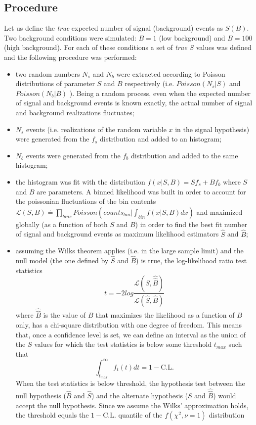 \documentclass[10pt, oneside]{article}   	%
\begin{document}
\subsection{Procedure}
Let us define the \textit{true} expected number of signal (background) events as $S (B)$.
Two background conditions were simulated: $B = 1$ (low background) and $B = 100$ (high background).
For each of these conditions a set of \textit{true} $S$ values was defined and the following procedure was performed:
\begin{itemize}
\item two random numbers $N_s$ and $N_b$ were extracted according to Poisson distributions of parameter $S$ and $B$ respectively (i.e. $Poisson(N_s | S)$ and $Poisson(N_b | B)$ ). Being a random process, even when the expected number of signal and background events is known exactly, the actual number of signal and background realizations fluctuates;
\item $N_s$ events (i.e. realizations of the random variable $x$ in the signal hypothesis) were generated from the $f_s$ distribution and added to an histogram;
\item $N_b$ events were generated from the $f_b$ distribution and added to the same histogram;
\item the histogram was fit with the distribution $f(x|S,B) = S f_s + B f_b$ where $S$ and $B$ are parameters. A binned likelihood was built in order to account for the poissonian fluctuations of the bin contents $\mathcal{L}(S,B) \doteq \prod_{bins} Poisson(counts_{bin} | \int_{bin}f(x|S,B)dx)$ and maximized globally (as a function of both $S$ and $B$) in order to find the best fit number of signal and background events as maximum likelihood estimators $\hat{S}$ and $\hat{B}$;
\item assuming the Wilks theorem applies (i.e. in the large sample limit) and the null model (the one defined by $\hat{S}$ and $\hat{B}$) is true, the log-likelihood ratio test statistics 
$$ t = -2log\frac{ \mathcal{L}(S,\hat{\hat{B}})}{\mathcal{L}(\hat{S},\hat{B})} $$
where $\hat{\hat{B}}$ is the value of $B$ that maximizes the likelihood as a function of $B$ only, has a chi-square distribution with one degree of freedom. This means that, once a confidence level is set, we can define an interval as the union of the $S$ values for which the test statistics is below some threshold $t_{max}$ such that 
$$\int_{t_{max}}^{\infty} f_t(t) dt = 1 - \mathrm{C.L.}$$
When the test statistics is below threshold, the hypothesis test between the null hypothesis ($\hat{B}$ and $\hat{S}$) and the alternate hypothesis ($S$ and $\hat{\hat{B}}$) would accept the null hypothesis.
Since we assume the Wilks' approximation holds, the threshold equals the $1 - \mathrm{C.L.}$ quantile of the $f(\chi^2,\nu = 1)$ distribution


\end{itemize}
\end{document}
